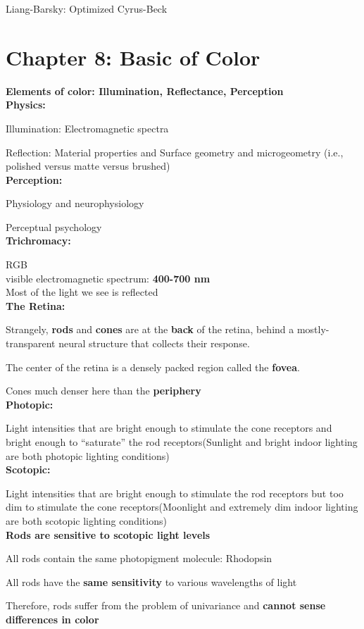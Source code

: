 \documentclass[]{report}
\begin{document}
Liang-Barsky: Optimized Cyrus-Beck


\section*{Chapter 8: Basic of Color}
\textbf{Elements of color: Illumination, Reflectance, Perception}\\
\textbf{Physics:}

Illumination: Electromagnetic spectra

Reflection: Material properties and Surface geometry and microgeometry (i.e., polished versus
matte versus brushed)\\
\textbf{Perception:}

Physiology and neurophysiology

Perceptual psychology\\
\textbf{Trichromacy:}

RGB\\
visible electromagnetic spectrum: \textbf{400-700 nm}\\
Most of the light we see is reflected\\
\textbf{The Retina:}

Strangely, \textbf{rods} and \textbf{cones} are
at the \textbf{back} of the retina,
behind a mostly-transparent
neural structure that
collects their response.

The center of the retina is a densely packed region called
the \textbf{fovea}.

Cones much denser here than the \textbf{periphery}\\
\textbf{Photopic:}

Light intensities that are bright enough to
stimulate the cone receptors and bright enough to
“saturate” the rod receptors(Sunlight and bright indoor lighting are both photopic lighting conditions)\\
\textbf{Scotopic:}

Light intensities that are bright enough to
stimulate the rod receptors but too dim to stimulate the
cone receptors(Moonlight and extremely dim indoor lighting are both scotopic lighting
conditions)\\
\textbf{Rods are sensitive to scotopic light levels}

All rods contain the same photopigment molecule: Rhodopsin

All rods have the \textbf{same sensitivity} to various wavelengths of light

Therefore, rods suffer from the problem of univariance and \textbf{cannot sense
differences in color}
\end{document}
